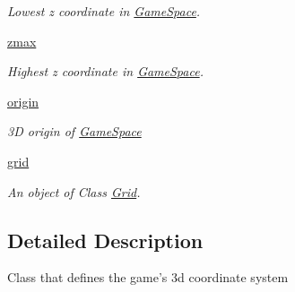 \begin{DoxyCompactItemize}
\begin{DoxyCompactList}\small\item\em \-Lowest z coordinate in \hyperlink{classSpace_1_1GameSpace}{\-Game\-Space}. \end{DoxyCompactList}\item 
\hypertarget{classSpace_1_1GameSpace_ac565ab1aa9690480d550974828c04386}{\hyperlink{classSpace_1_1GameSpace_ac565ab1aa9690480d550974828c04386}{zmax}}\label{classSpace_1_1GameSpace_ac565ab1aa9690480d550974828c04386}

\begin{DoxyCompactList}\small\item\em \-Highest z coordinate in \hyperlink{classSpace_1_1GameSpace}{\-Game\-Space}. \end{DoxyCompactList}\item 
\hypertarget{classSpace_1_1GameSpace_adc5f59409eacd572ba34f4f0ff0364c2}{\hyperlink{classSpace_1_1GameSpace_adc5f59409eacd572ba34f4f0ff0364c2}{origin}}\label{classSpace_1_1GameSpace_adc5f59409eacd572ba34f4f0ff0364c2}

\begin{DoxyCompactList}\small\item\em 3\-D origin of \hyperlink{classSpace_1_1GameSpace}{\-Game\-Space} \end{DoxyCompactList}\item 
\hyperlink{classSpace_1_1GameSpace_afdb040ef0a38174732380394f6a219dc}{grid}
\begin{DoxyCompactList}\small\item\em \-An object of \-Class \hyperlink{classSpace_1_1Grid}{\-Grid}. \end{DoxyCompactList}\end{DoxyCompactItemize}


\subsection{\-Detailed \-Description}
\begin{DoxyVerb}Class that defines the game's 3d coordinate system\end{DoxyVerb}
 

